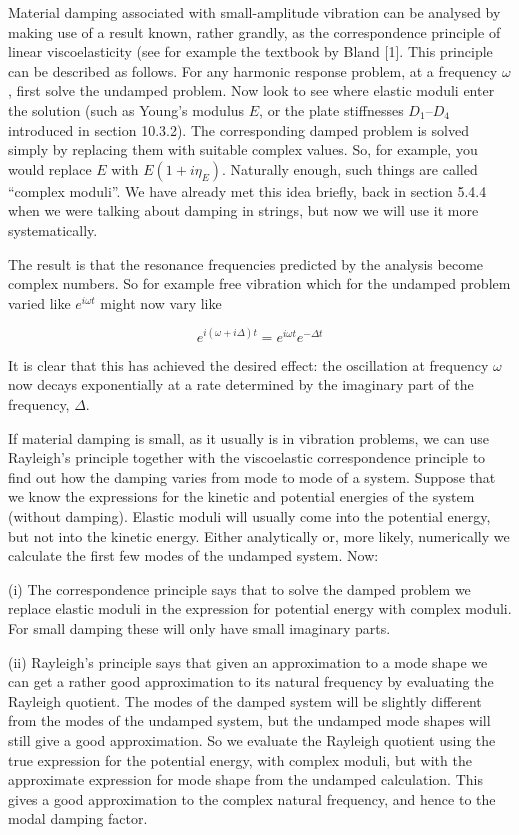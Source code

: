   Material damping associated with small-amplitude vibration can be analysed by 
  making use of a result known, rather grandly, as the correspondence principle 
  of linear viscoelasticity (see for example the textbook by Bland [1]. This 
  principle can be described as follows. For any harmonic response problem, at 
  a frequency $\omega$, first solve the undamped problem. Now look to see where 
  elastic moduli enter the solution (such as Young's modulus $E$, or the plate 
  stiffnesses $D_1$--$D_4$ introduced in section 10.3.2). The corresponding 
  damped problem is solved simply by replacing them with suitable complex 
  values. So, for example, you would replace $E$ with $E(1+i \eta_E)$. 
  Naturally enough, such things are called ``complex moduli''. We have already 
  met this idea briefly, back in section 5.4.4 when we were talking about 
  damping in strings, but now we will use it more systematically. 

  The result is that the resonance frequencies predicted by the analysis become 
  complex numbers. So for example free vibration which for the undamped problem 
  varied like $e^{i \omega t}$ might now vary like 

  \begin{equation*}e^{i(\omega + i \Delta)t} = e^{i \omega t} e^{-\Delta t} 
  \tag{1}\end{equation*} 

  It is clear that this has achieved the desired effect: the oscillation at 
  frequency $\omega$ now decays exponentially at a rate determined by the 
  imaginary part of the frequency, $\Delta$. 

  If material damping is small, as it usually is in vibration problems, we can 
  use Rayleigh's principle together with the viscoelastic correspondence 
  principle to find out how the damping varies from mode to mode of a system. 
  Suppose that we know the expressions for the kinetic and potential energies 
  of the system (without damping). Elastic moduli will usually come into the 
  potential energy, but not into the kinetic energy. Either analytically or, 
  more likely, numerically we calculate the first few modes of the undamped 
  system. Now: 

  (i)	The correspondence principle says that to solve the damped problem we 
  replace elastic moduli in the expression for potential energy with complex 
  moduli. For small damping these will only have small imaginary parts. 

  (ii)	Rayleigh's principle says that given an approximation to a mode shape we 
  can get a rather good approximation to its natural frequency by evaluating 
  the Rayleigh quotient. The modes of the damped system will be slightly 
  different from the modes of the undamped system, but the undamped mode shapes 
  will still give a good approximation. So we evaluate the Rayleigh quotient 
  using the true expression for the potential energy, with complex moduli, but 
  with the approximate expression for mode shape from the undamped calculation. 
  This gives a good approximation to the complex natural frequency, and hence 
  to the modal damping factor. 

